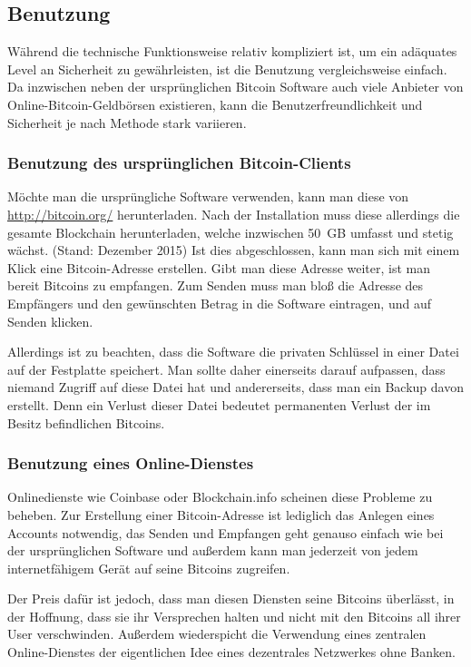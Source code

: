 \subsection{Benutzung}

Während die technische Funktionsweise relativ kompliziert ist, um ein adäquates Level an Sicherheit zu gewährleisten, ist die Benutzung vergleichsweise einfach.
Da inzwischen neben der ursprünglichen Bitcoin Software auch viele Anbieter von Online-Bitcoin-Geldbörsen existieren, kann die Benutzerfreundlichkeit und Sicherheit je nach Methode stark variieren.

\subsubsection{Benutzung des ursprünglichen Bitcoin-Clients}

Möchte man die ursprüngliche Software verwenden, kann man diese von \url{http://bitcoin.org/} herunterladen.
Nach der Installation muss diese allerdings die gesamte Blockchain herunterladen, welche inzwischen 50~GB umfasst und stetig wächst. (Stand: Dezember 2015)
Ist dies abgeschlossen, kann man sich mit einem Klick eine Bitcoin-Adresse erstellen.
Gibt man diese Adresse weiter, ist man bereit Bitcoins zu empfangen.
Zum Senden muss man bloß die Adresse des Empfängers und den gewünschten Betrag in die Software eintragen, und auf Senden klicken.

Allerdings ist zu beachten, dass die Software die privaten Schlüssel in einer Datei auf der Festplatte speichert.
Man sollte daher einerseits darauf aufpassen, dass niemand Zugriff auf diese Datei hat und andererseits, dass man ein Backup davon erstellt.
Denn ein Verlust dieser Datei bedeutet permanenten Verlust der im Besitz befindlichen Bitcoins.

\subsubsection{Benutzung eines Online-Dienstes}

Onlinedienste wie Coinbase oder Blockchain.info scheinen diese Probleme zu beheben.
Zur Erstellung einer Bitcoin-Adresse ist lediglich das Anlegen eines Accounts notwendig, das Senden und Empfangen geht genauso einfach wie bei der ursprünglichen Software und außerdem kann man jederzeit von jedem internetfähigem Gerät auf seine Bitcoins zugreifen.

Der Preis dafür ist jedoch, dass man diesen Diensten seine Bitcoins überlässt, in der Hoffnung, dass sie ihr Versprechen halten und nicht mit den Bitcoins all ihrer User verschwinden.
Außerdem wiederspicht die Verwendung eines zentralen Online-Dienstes der eigentlichen Idee eines dezentrales Netzwerkes ohne Banken.
